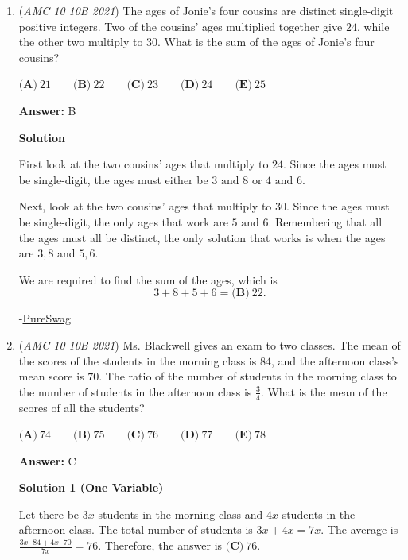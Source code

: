 \begin{enumerate}
	\item (\textit{AMC 10 10B 2021}) The ages of Jonie's four cousins are distinct single-digit positive integers. Two of the cousins' ages multiplied together give $24$, while the other two multiply to $30$. What is the sum of the ages of Jonie's four cousins?


 $\textbf{(A)} ~21 \qquad\textbf{(B)} ~22 \qquad\textbf{(C)} ~23 \qquad\textbf{(D)} ~24 \qquad\textbf{(E)} ~25$

 \textbf{Answer: }B



\textbf{Solution}

First look at the two cousins' ages that multiply to $24$. Since the ages must be single-digit, the ages must either be $3 \text{ and } 8$ or $4 \text{ and } 6.$

 Next, look at the two cousins' ages that multiply to $30$. Since the ages must be single-digit, the only ages that work are $5 \text{ and } 6.$ Remembering that all the ages must all be distinct, the only solution that works is when the ages are $3, 8$ and $5, 6$.

 We are required to find the sum of the ages, which is 
 \[3 + 8 + 5 + 6 = \boxed{\textbf{(B)} ~22}.\]

 -\href{https://artofproblemsolving.com/wiki/index.php?title=User:PureSwag}{PureSwag}

 


	\item (\textit{AMC 10 10B 2021}) Ms. Blackwell gives an exam to two classes. The mean of the scores of the students in the morning class is $84$, and the afternoon class's mean score is $70$. The ratio of the number of students in the morning class to the number of students in the afternoon class is $\frac{ 3}{4}$. What is the mean of the scores of all the students?


 $\textbf{(A)} ~74 \qquad\textbf{(B)} ~75 \qquad\textbf{(C)} ~76 \qquad\textbf{(D)} ~77 \qquad\textbf{(E)} ~78$

 \textbf{Answer: }C



\textbf{Solution 1 (One Variable)}

Let there be $3x$ students in the morning class and $4x$ students in the afternoon class. The total number of students is $3x + 4x = 7x$. The average is $\frac{3x\cdot84 + 4x\cdot70}{7x}=76$. Therefore, the answer is $\boxed{\textbf{(C)} ~76}$.

 




\end{enumerate}
